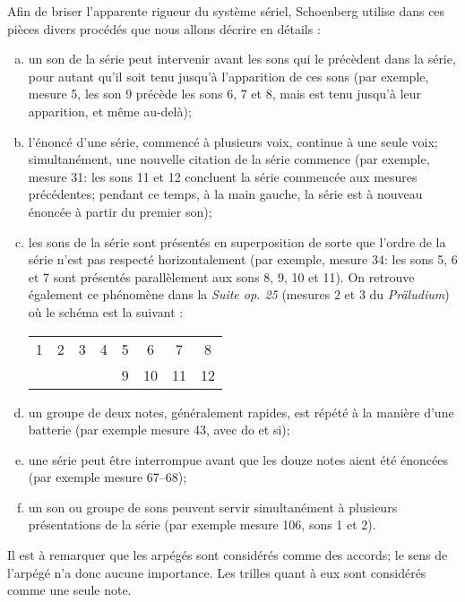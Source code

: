 \documentclass[11pt,a4paper]{scrreprt}
\begin{document}
Afin de \og{} briser \fg{} l'apparente rigueur du système sériel, Schoenberg utilise dans ces pièces divers procédés que nous allons décrire en détails :

\begin{enumerate}[a.]
\item un son de la série peut intervenir avant les sons qui le précèdent dans la série, pour autant qu'il soit tenu jusqu'à l'apparition de ces sons (par exemple, mesure 5, les son 9 précède les sons 6, 7 et 8, mais est tenu jusqu'à leur apparition, et même au-delà);
\item l'énoncé d'une série, commencé à plusieurs voix, continue à une seule voix; simultanément, une nouvelle citation de la série commence (par exemple, mesure 31: les sons 11 et 12 concluent la série commencée aux mesures précédentes; pendant ce temps, à la main gauche, la série est à nouveau énoncée à partir du premier son);
\item les sons de la série sont présentés en superposition de sorte que l'ordre de la série n'est pas respecté horizontalement (par exemple, mesure 34: les sons 5, 6 et 7 sont présentés parallèlement aux sons 8, 9, 10 et 11). On retrouve également ce phénomène dans la \emph{Suite op. 25} (mesures 2 et 3 du \emph{Präludium}) où le schéma est la suivant :

	\begin{tabular}{cccccccc}
		1 & 2 & 3 & 4 & 5 & 6  & 7  & 8  \\ 
		  &   &   &   & 9 & 10 & 11 & 12
	\end{tabular}
\item un groupe de deux notes, généralement rapides, est répété à la manière d'une batterie (par exemple mesure 43, avec do \fetasharp{} et si);
\item une série peut être interrompue avant que les douze notes aient été énoncées (par exemple mesure 67--68);
\item un son ou groupe de sons peuvent servir simultanément à plusieurs présentations de la série (par exemple mesure 106, sons 1 et 2).
\end{enumerate}

Il est à remarquer que les arpégés sont considérés comme des accords; le sens de l'arpégé n'a donc aucune importance. Les trilles quant à eux sont considérés comme une seule note.
\end{document}
